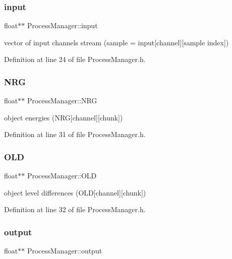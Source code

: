 \subsubsection{\texorpdfstring{input}{input}}
{\footnotesize\ttfamily float$\ast$$\ast$ Process\+Manager\+::input}

vector of input channels stream (sample = input\mbox{[}channel\mbox{]}\mbox{[}sample index\mbox{]}) 

Definition at line 24 of file Process\+Manager.\+h.

\mbox{\label{class_process_manager_a70a556eaff879d870603033a9ffcbc5b}} 
\subsubsection{\texorpdfstring{N\+RG}{NRG}}
{\footnotesize\ttfamily float$\ast$$\ast$ Process\+Manager\+::\+N\+RG}

object energies (N\+RG\mbox{[}channel\mbox{]}\mbox{[}chunk\mbox{]}) 

Definition at line 31 of file Process\+Manager.\+h.

\mbox{\label{class_process_manager_a3c015ada1a03ef508a542f9b2f6a8ff3}} 
\subsubsection{\texorpdfstring{O\+LD}{OLD}}
{\footnotesize\ttfamily float$\ast$$\ast$ Process\+Manager\+::\+O\+LD}

object level differences (O\+LD\mbox{[}channel\mbox{]}\mbox{[}chunk\mbox{]}) 

Definition at line 32 of file Process\+Manager.\+h.

\mbox{\label{class_process_manager_a135c866f06b0042c2835cd9ecefa05f3}} 
\subsubsection{\texorpdfstring{output}{output}}
{\footnotesize\ttfamily float$\ast$$\ast$ Process\+Manager\+::output}

